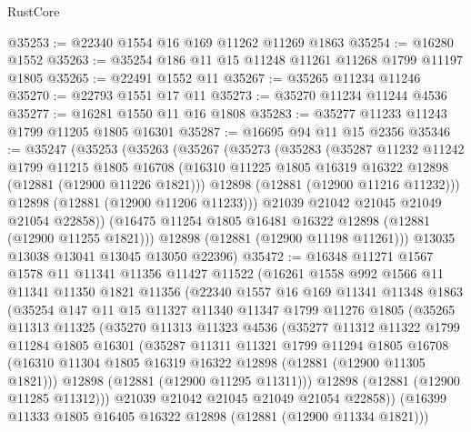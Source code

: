\begin{lexlean}{RustCore}
\begin{coremodule}
@35253 := @22340 @1554 @16 @169 @11262 @11269 @1863
@35254 := @16280 @1552
@35263 := @35254 @186 @11 @15 @11248 @11261 @11268 @1799 @11197 @1805
@35265 := @22491 @1552 @11
@35267 := @35265 @11234 @11246
@35270 := @22793 @1551 @17 @11
@35273 := @35270 @11234 @11244 @4536
@35277 := @16281 @1550 @11 @16 @1808
@35283 := @35277 @11233 @11243 @1799 @11205 @1805 @16301
@35287 := @16695 @94 @11 @15 @2356
@35346 := @35247
    (@35253
      (@35263
        (@35267
          (@35273
            (@35283
              (@35287
                @11232
                @11242
                @1799
                @11215
                @1805
                @16708
                (@16310 @11225 @1805 @16319 @16322 @12898 (@12881 (@12900 @11226 @1821)))
                @12898
                (@12881 (@12900 @11216 @11232)))
              @12898
              (@12881 (@12900 @11206 @11233)))
            @21039
            @21042
            @21045
            @21049
            @21054
            @22858))
        (@16475 @11254 @1805 @16481 @16322 @12898 (@12881 (@12900 @11255 @1821)))
        @12898
        (@12881 (@12900 @11198 @11261)))
      @13035
      @13038
      @13041
      @13045
      @13050
      @22396)
@35472 := @16348
    @11271
    @1567
    @1578
    @11
    @11341
    @11356
    @11427
    @11522
    (@16261
      @1558
      @992
      @1566
      @11
      @11341
      @11350
      @1821
      @11356
      (@22340
        @1557
        @16
        @169
        @11341
        @11348
        @1863
        (@35254
          @147
          @11
          @15
          @11327
          @11340
          @11347
          @1799
          @11276
          @1805
          (@35265
            @11313
            @11325
            (@35270
              @11313
              @11323
              @4536
              (@35277
                @11312
                @11322
                @1799
                @11284
                @1805
                @16301
                (@35287
                  @11311
                  @11321
                  @1799
                  @11294
                  @1805
                  @16708
                  (@16310 @11304 @1805 @16319 @16322 @12898 (@12881 (@12900 @11305 @1821)))
                  @12898
                  (@12881 (@12900 @11295 @11311)))
                @12898
                (@12881 (@12900 @11285 @11312)))
              @21039
              @21042
              @21045
              @21049
              @21054
              @22858))
          (@16399 @11333 @1805 @16405 @16322 @12898 (@12881 (@12900 @11334 @1821)))

\end{coremodule}
\end{lexlean}
